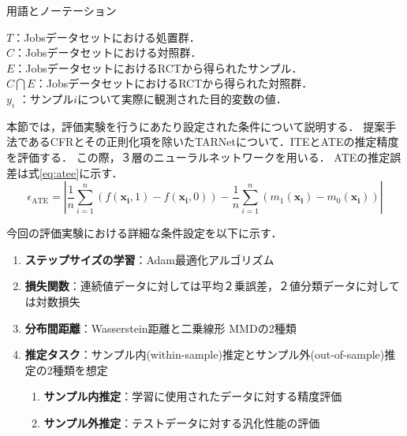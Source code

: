\documentclass[dvipdfmx]{jreport}
\begin{document}
\begin{itembox}[l]{\large{用語とノーテーション}}
\begin{tabbing}
        \hspace{15pt} \raisebox{0.5ex}{\tiny $\bullet$} $T$\>：Jobsデータセットにおける処置群．\\[0.5em]
        \hspace{15pt} \raisebox{0.5ex}{\tiny $\bullet$} $C$\>：Jobsデータセットにおける対照群．\\[0.5em]
        \hspace{15pt} \raisebox{0.5ex}{\tiny $\bullet$} $E$\>：JobsデータセットにおけるRCTから得られたサンプル．\\[0.5em]
        \hspace{15pt} \raisebox{0.5ex}{\tiny $\bullet$} $C \bigcap E$\>：JobsデータセットにおけるRCTから得られた対照群．\\[0.5em]
        \hspace{15pt} \raisebox{0.5ex}{\tiny $\bullet$} $y_i$ \> ：サンプル$i$について実際に観測された目的変数の値．
    \end{tabbing}
\end{itembox}

本節では，評価実験を行うにあたり設定された条件について説明する．
提案手法であるCFRとその正則化項を除いたTARNetについて．ITEとATEの推定精度を評価する．
この際，３層のニューラルネットワークを用いる．
ATEの推定誤差は式\eqref{eq:atee}に示す．
\begin{equation}
    \epsilon_{\mathrm{ATE}} = \left| \frac{1}{n} \sum_{i=1}^{n} \left( f(\boldsymbol{x_i}, 1) - f(\boldsymbol{x_i}, 0) \right) - \frac{1}{n} \sum_{i=1}^{n} \left( m_1(\boldsymbol{x_i}) - m_0(\boldsymbol{x_i}) \right) \right| \label{eq:atee}
\end{equation}

今回の評価実験における詳細な条件設定を以下に示す．
\begin{tcolorbox}[title=\textbf{評価実験の条件設定}]
    \begin{enumerate}
        \item \textbf{ステップサイズの学習}：Adam最適化アルゴリズム
        \item \textbf{損失関数}：連続値データに対しては平均２乗誤差，２値分類データに対しては対数損失
        \item \textbf{分布間距離}：Wasserstein距離と二乗線形 MMDの2種類
        \item \textbf{推定タスク}：サンプル内(within-sample)推定とサンプル外(out-of-sample)推定の2種類を想定
        \begin{enumerate}
            \item \textbf{サンプル内推定}：学習に使用されたデータに対する精度評価
            \item \textbf{サンプル外推定}：テストデータに対する汎化性能の評価
        \end{enumerate}
    \end{enumerate}
\end{tcolorbox}
\end{document}
